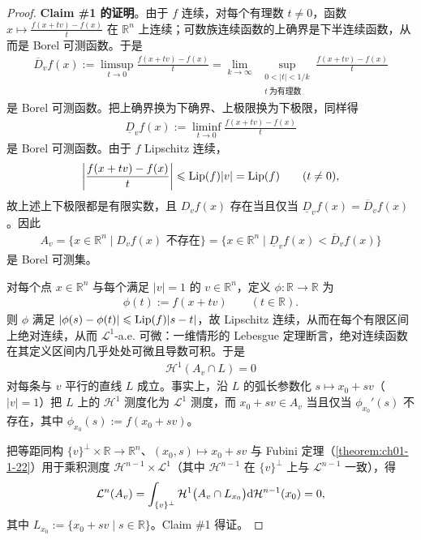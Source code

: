 \documentclass[../../main.tex]{subfiles}%
\begin{document}
\begin{proof}
\textbf{Claim \#1 的证明}。由于 $f$ 连续，对每个有理数 $t\neq0$，函数 $x\mapsto\frac{f(x+tv)-f(x)}{t}$ 在 $\mathbb{R}^n$ 上连续；可数族连续函数的上确界是下半连续函数，从而是 Borel 可测函数。于是
\begin{align*}
\overline{D}_vf(x):=\limsup_{t\to0}\frac{f(x+tv)-f(x)}{t}
=\lim_{k\to\infty}\;\sup_{\substack{0<\lvert t\rvert<1/k\\ t\ \text{为有理数}}}\frac{f(x+tv)-f(x)}{t}
\end{align*}
是 Borel 可测函数。把上确界换为下确界、上极限换为下极限，同样得
\begin{align*}
\underline{D}_vf(x):=\liminf_{t\to0}\frac{f(x+tv)-f(x)}{t}
\end{align*}
是 Borel 可测函数。由于 $f$ Lipschitz 连续，
\begin{align*}
\biggl\lvert\frac{f(x+tv)-f(x)}{t}\biggr\rvert\leqslant\operatorname{Lip}(f)\lvert v\rvert=\operatorname{Lip}(f)\qquad(t\neq0),
\end{align*}
故上述上下极限都是有限实数，且 $D_vf(x)$ 存在当且仅当 $\underline{D}_vf(x)=\overline{D}_vf(x)$。因此
\begin{align*}
A_v=\{x\in\mathbb{R}^n\mid D_vf(x)\text{ 不存在}\}
=\{x\in\mathbb{R}^n\mid \underline{D}_vf(x)<\overline{D}_vf(x)\}
\end{align*}
是 Borel 可测集。

对每个点 $x\in\mathbb{R}^n$ 与每个满足 $\lvert v\rvert=1$ 的 $v\in\mathbb{R}^n$，定义 $\phi:\mathbb{R}\to\mathbb{R}$ 为
\begin{align*}
\phi(t):=f(x+tv)\qquad(t\in\mathbb{R}).
\end{align*}
则 $\phi$ 满足 $\lvert\phi(s)-\phi(t)\rvert\leqslant\operatorname{Lip}(f)\lvert s-t\rvert$，故 Lipschitz 连续，从而在每个有限区间上绝对连续，从而 $\mathcal{L}^1$-a.e. 可微：一维情形的 Lebesgue 定理断言，绝对连续函数在其定义区间内几乎处处可微且导数可积。于是
\begin{align*}
\mathcal{H}^1(A_v\cap L)=0
\end{align*}
对每条与 $v$ 平行的直线 $L$ 成立。事实上，沿 $L$ 的弧长参数化 $s\mapsto x_0+sv$（$\lvert v\rvert=1$）把 $L$ 上的 $\mathcal{H}^1$ 测度化为 $\mathcal{L}^1$ 测度，而 $x_0+sv\in A_v$ 当且仅当 $\phi_{x_0}'(s)$ 不存在，其中 $\phi_{x_0}(s):=f(x_0+sv)$。

把等距同构 $\{v\}^{\perp}\times\mathbb{R}\to\mathbb{R}^n$、$(x_0,s)\mapsto x_0+sv$ 与 Fubini 定理（\cref{theorem:ch01-1-22}）用于乘积测度 $\mathcal{H}^{n-1}\times\mathcal{L}^1$（其中 $\mathcal{H}^{n-1}$ 在 $\{v\}^{\perp}$ 上与 $\mathcal{L}^{n-1}$ 一致），得%
\begin{align*}
\mathcal{L}^n(A_v)=\int_{\{v\}^{\perp}}\mathcal{H}^1\bigl(A_v\cap L_{x_0}\bigr)\mathrm{d}\mathcal{H}^{n-1}(x_0)=0,
\end{align*}
其中 $L_{x_0}:=\{x_0+sv\mid s\in\mathbb{R}\}$。Claim \#1 得证。


\end{proof}
\end{document}
